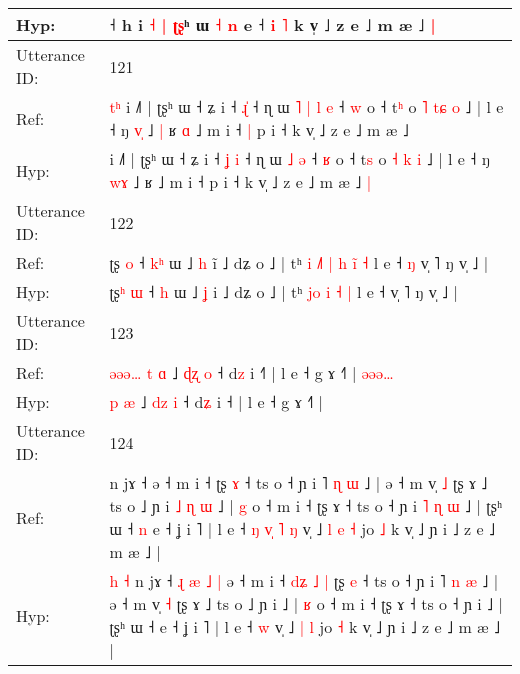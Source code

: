 \documentclass[10pt]{article}
\DeclareRobustCommand{\hl}[1]{{\textcolor{red}{#1}}}
\begin{document}
\begin{longtable}{ll}
Hyp: & \hl{}\hl{}˧ h i\hl{}\hl{} \hl{˧} \hl{|} \hl{}\hl{ʈ}\hl{ʂ}ʰ ɯ\hl{}\hl{} \hl{˧} \hl{n} e ˧ \hl{}\hl{i} \hl{˥} k v̩ ˩ z e ˩ m æ ˩\hl{ }\hl{|}
 \\
\midrule
Utterance ID: & 121 \\
Ref: & \hl{t}\hl{ʰ}\hl{ }i ˩˥ | ʈʂʰ ɯ ˧ ʑ i ˧ \hl{}\hl{ɻ}\hl{̍} ˧ ɳ ɯ\hl{ }\hl{˥}\hl{ }\hl{|} \hl{l} \hl{e} ˧ \hl{w} o ˧ t\hl{ʰ} o \hl{˥} \hl{t}\hl{ɕ} \hl{o} ˩ | l e ˧ ŋ \hl{v}\hl{̩} ˩\hl{ }\hl{|} ʁ\hl{ }\hl{ɑ} ˩ m i ˧\hl{ }\hl{|} p i ˧ k v̩ ˩ z e ˩ m æ ˩\hl{}\hl{}
 \\
Hyp: & \hl{}\hl{}\hl{}i ˩˥ | ʈʂʰ ɯ ˧ ʑ i ˧ \hl{ʝ}\hl{ }\hl{i} ˧ ɳ ɯ\hl{}\hl{}\hl{}\hl{} \hl{˩} \hl{ə} ˧ \hl{ʁ} o ˧ t\hl{s} o \hl{˧} \hl{}\hl{k} \hl{i} ˩ | l e ˧ ŋ \hl{w}\hl{ɤ} ˩\hl{}\hl{} ʁ\hl{}\hl{} ˩ m i ˧\hl{}\hl{} p i ˧ k v̩ ˩ z e ˩ m æ ˩\hl{ }\hl{|}
 \\
\midrule
Utterance ID: & 122 \\
Ref: & ʈʂ\hl{} \hl{o} ˧ \hl{k}\hl{ʰ} ɯ ˩ \hl{h} i\hl{̃} ˩ dʑ o ˩ | tʰ\hl{ }\hl{i} \hl{˩}\hl{˥}\hl{ }\hl{|} \hl{h} \hl{i}\hl{̃} \hl{˧} l e ˧\hl{ }\hl{ŋ} v̩ ˥ ŋ v̩ ˩ |
 \\
Hyp: & ʈʂ\hl{ʰ} \hl{ɯ} ˧ \hl{}\hl{h} ɯ ˩ \hl{ʝ} i\hl{} ˩ dʑ o ˩ | tʰ\hl{}\hl{} \hl{}\hl{}\hl{j}\hl{o} \hl{i} \hl{}\hl{˧} \hl{|} l e ˧\hl{}\hl{} v̩ ˥ ŋ v̩ ˩ |
 \\
\midrule
Utterance ID: & 123 \\
Ref: & \hl{ə}\hl{ə}\hl{ə}\hl{…}\hl{ }\hl{t} \hl{ɑ} ˩ \hl{ɖ}\hl{ʐ} \hl{o} ˧ d\hl{z} i ˧\hl{˥} | l e ˧ g ɤ ˧˥ |\hl{ }\hl{ə}\hl{ə}\hl{ə}\hl{…}
 \\
Hyp: & \hl{}\hl{}\hl{}\hl{}\hl{}\hl{p} \hl{æ} ˩ \hl{d}\hl{z} \hl{i} ˧ d\hl{ʑ} i ˧\hl{} | l e ˧ g ɤ ˧˥ |\hl{}\hl{}\hl{}\hl{}\hl{}
 \\
\midrule
Utterance ID: & 124 \\
Ref: & \hl{}\hl{}\hl{}\hl{}n jɤ ˧\hl{}\hl{}\hl{}\hl{}\hl{}\hl{}\hl{}\hl{} ə ˧ m i ˧\hl{}\hl{}\hl{}\hl{}\hl{}\hl{}\hl{} ʈʂ \hl{ɤ} ˧ ts o ˧ ɲ i ˥ \hl{ɳ} \hl{ɯ} ˩ | ə ˧ m v̩ \hl{˩} ʈʂ ɤ ˩ ts o ˩ ɲ i\hl{ }\hl{˩}\hl{ }\hl{ɳ}\hl{ }\hl{ɯ} ˩ | \hl{g} o ˧ m i ˧ ʈʂ ɤ ˧ ts o ˧ ɲ i\hl{ }\hl{˥}\hl{ }\hl{ɳ}\hl{ }\hl{ɯ} ˩ | ʈʂʰ ɯ ˧\hl{ }\hl{n} e ˧ ʝ i ˥ | l e ˧\hl{ }\hl{ŋ}\hl{ }\hl{v}\hl{̩}\hl{ }\hl{˥} \hl{ŋ} v̩ ˩\hl{ }\hl{l} \hl{e} \hl{˧} jo \hl{˩} k v̩ ˩ ɲ i ˩ z e ˩ m æ ˩ |
 \\
Hyp: & \hl{h}\hl{ }\hl{˧}\hl{ }n jɤ ˧\hl{ }\hl{ɻ}\hl{ }\hl{æ}\hl{ }\hl{˩}\hl{ }\hl{|} ə ˧ m i ˧\hl{ }\hl{d}\hl{ʑ}\hl{ }\hl{˩}\hl{ }\hl{|} ʈʂ \hl{e} ˧ ts o ˧ ɲ i ˥ \hl{n} \hl{æ} ˩ | ə ˧ m v̩ \hl{˧} ʈʂ ɤ ˩ ts o ˩ ɲ i\hl{}\hl{}\hl{}\hl{}\hl{}\hl{} ˩ | \hl{ʁ} o ˧ m i ˧ ʈʂ ɤ ˧ ts o ˧ ɲ i\hl{}\hl{}\hl{}\hl{}\hl{}\hl{} ˩ | ʈʂʰ ɯ ˧\hl{}\hl{} e ˧ ʝ i ˥ | l e ˧\hl{}\hl{}\hl{}\hl{}\hl{}\hl{}\hl{} \hl{w} v̩ ˩\hl{}\hl{} \hl{|} \hl{l} jo \hl{˧} k v̩ ˩ ɲ i ˩ z e ˩ m æ ˩ |

\end{longtable}
\end{document}
